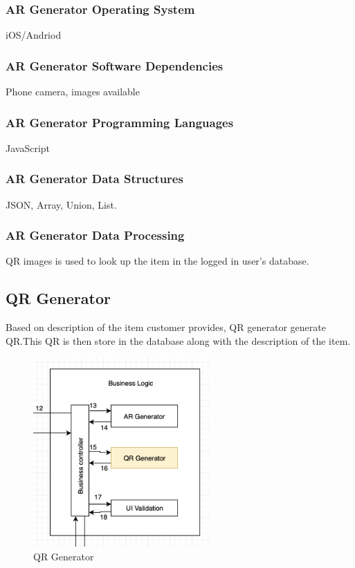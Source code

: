 \subsubsection{AR Generator Operating System}
iOS/Andriod

\subsubsection{AR Generator Software Dependencies}
Phone camera, images available

\subsubsection{AR Generator Programming Languages}
JavaScript

\subsubsection{AR Generator Data Structures}
JSON, Array, Union, List.

\subsubsection{AR Generator Data Processing}
QR images is used to look up the item in the logged in user's database.


\subsection{QR Generator}
Based on description of the item customer provides, QR generator generate QR.This QR is then store in the database along with the  description of the item.

\begin{figure}[h!]
	\centering
 	\includegraphics[width=0.60\textwidth]{images/qrgenerator}
 \caption{QR Generator}
\end{figure}

